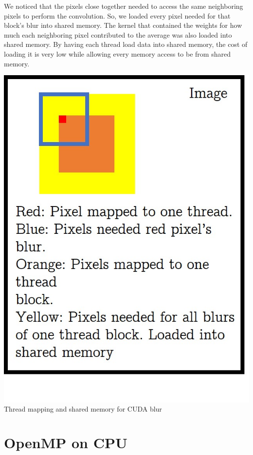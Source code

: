 \documentclass[12pt]{article}
\begin{document}
We noticed that the pixels close together needed to access the same neighboring
pixels to perform the convolution. So, we loaded every pixel needed for that
block's blur into shared memory. The kernel that contained the weights for how
much each neighboring pixel contributed to the average was also loaded into
shared memory. By having each thread load data into shared memory, the cost of
loading it is very low while allowing every memory access to be from shared
memory.

\begin{center}
\includegraphics[scale=0.3]{mapping.jpg} \\
Thread mapping and shared memory for CUDA blur
\end{center}

\section{OpenMP on CPU}
\end{document}
